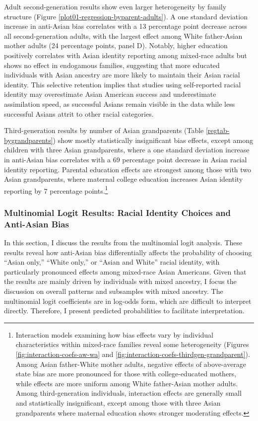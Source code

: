 Adult second-generation results show even larger heterogeneity by family structure (Figure \ref{plot01-regression-byparent-adults}). A one standard deviation increase in anti-Asian bias correlates with a 13 percentage point decrease across all second-generation adults, with the largest effect among White father-Asian mother adults (24 percentage points, panel D). Notably, higher education positively correlates with Asian identity reporting among mixed-race adults but shows no effect in endogamous families, suggesting that more educated individuals with Asian ancestry are more likely to maintain their Asian racial identity. This selective retention implies that studies using self-reported racial identity may overestimate Asian American success and underestimate assimilation speed, as successful Asians remain visible in the data while less successful Asians attrit to other racial categories.

Third-generation results by number of Asian grandparents (Table \ref{regtab-bygrandparents}) show mostly statistically insignificant bias effects, except among children with three Asian grandparents, where a one standard deviation increase in anti-Asian bias correlates with a 69 percentage point decrease in Asian racial identity reporting. Parental education effects are strongest among those with two Asian grandparents, where maternal college education increases Asian identity reporting by 7 percentage points.\footnote{Interaction models examining how bias effects vary by individual characteristics within mixed-race families reveal some heterogeneity (Figures \ref{fig:interaction-coefs-aw-wa} and \ref{fig:interaction-coefs-thirdgen-grandparent}). Among Asian father-White mother adults, negative effects of above-average state bias are more pronounced for those with college-educated mothers, while effects are more uniform among White father-Asian mother adults. Among third-generation individuals, interaction effects are generally small and statistically insignificant, except among those with three Asian grandparents where maternal education shows stronger moderating effects.}

\subsubsection{Multinomial Logit Results: Racial Identity Choices and Anti-Asian Bias}\label{sec:multinomial}

In this section, I discuss the results from the multinomial logit analysis. These results reveal how anti-Asian bias differentially affects the probability of choosing ``Asian only,'' ``White only,'' or ``Asian and White'' racial identity, with particularly pronounced effects among mixed-race Asian Americans. Given that the results are mainly driven by individuals with mixed ancestry, I focus the discussion on overall patterns and subsamples with mixed ancestry. The multinomial logit coefficients are in log-odds form, which are difficult to interpret directly. Therefore, I present predicted probabilities to facilitate interpretation.


